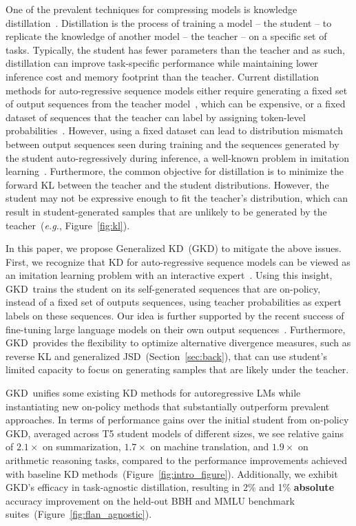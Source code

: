 \documentclass{article} %
\def\alg{GKD}
\newcommand{\addtext}[1]{#1}
\begin{document}
One of the prevalent techniques for compressing  models is knowledge distillation~\citep{hinton2015distilling}. Distillation is the process of training a model -- the student --  to replicate the knowledge of another model -- the teacher -- on a specific set of tasks. Typically, the student has fewer parameters than the teacher and as such, distillation can improve task-specific performance while maintaining lower inference cost and memory footprint than the teacher. Current distillation methods for auto-regressive sequence models either require generating a fixed set of output sequences from the teacher model~\citep{kim2016sequence}, which can be expensive, or a fixed dataset of sequences that the teacher can label by assigning token-level probabilities~\citep{sanh2019distilbert}. However, using a fixed dataset can lead to distribution mismatch between output sequences seen during training and the sequences generated by the student auto-regressively during inference, a well-known problem in imitation learning~\citep{pomerleau1991efficient, ross2010efficient}. Furthermore, the common objective for distillation is to minimize the forward KL between the teacher and the student distributions. However, the student may not be expressive enough to fit the teacher's distribution, which can result in student-generated samples that are unlikely to be generated by the teacher~(\emph{e.g.}, Figure~\ref{fig:kl}).

In this paper, we propose Generalized KD~(\alg) to mitigate the above issues. First, we recognize that KD for auto-regressive sequence models can be viewed as an imitation learning problem with an interactive expert~\citep{ross2011reduction}. Using this insight, \alg\ trains the student on its self-generated sequences that are on-policy, instead of a fixed set of outputs sequences, using teacher probabilities as expert labels on these sequences. Our idea is further supported by the recent success of fine-tuning large language models on their own output sequences~\citep{ouyang2022training, singh2023beyond}. Furthermore, \alg\ provides the flexibility to optimize alternative divergence measures, such as reverse KL and generalized JSD~(Section~\ref{sec:back}), that can use student's limited capacity to focus on generating samples that are likely under the teacher. 

\addtext{\alg\ unifies some existing KD methods for autoregressive LMs while instantiating new on-policy methods that substantially outperform prevalent approaches.} In terms of performance gains over the initial student from on-policy GKD, averaged across T5 student models of different sizes, we see relative gains of $\mathbf{2.1}\times$ on summarization, $\mathbf{1.7}\times$ on machine translation, and $\mathbf{1.9}\times$ on arithmetic reasoning tasks, compared to the performance improvements achieved with baseline KD methods~(Figure~\ref{fig:intro_figure}). \addtext{Additionally, we exhibit GKD's efficacy in task-agnostic distillation, resulting in 2\% and 1\% \textbf{absolute} accuracy improvement on the held-out BBH and MMLU  benchmark suites~(Figure~\ref{fig:flan_agnostic})}.
\end{document}
